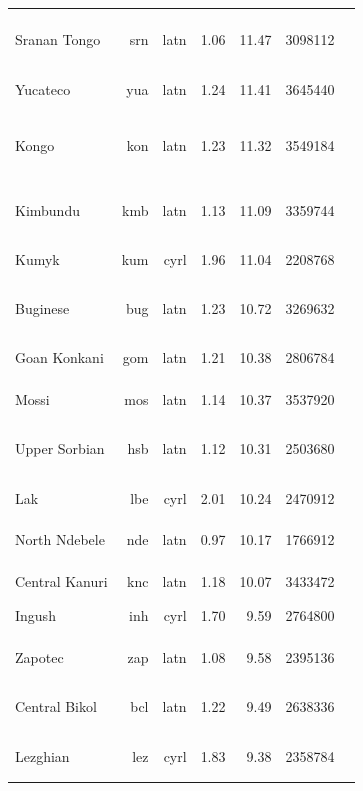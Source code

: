 \documentclass[11pt]{article}
\begin{document}
\begin{center}
\begin{longtable}[width=0.9\textwidth]{|lrrrrrl|}
Sranan Tongo & srn & latn & 1.06 & 11.47 & 3098112 & {\color{madlad400}\rule{3.45cm}{8pt}}{\color{glot500}\rule{0.27cm}{8pt}}{\color{other}\rule{0.2799999999999998cm}{8pt}} \\ 
Yucateco & yua & latn & 1.24 & 11.41 & 3645440 & {\color{madlad400}\rule{4.0cm}{8pt}} \\ 
Kongo & kon & latn & 1.23 & 11.32 & 3549184 & {\color{nllb}\rule{3.23cm}{8pt}}{\color{madlad400}\rule{0.66cm}{8pt}}{\color{glot500}\rule{0.06cm}{8pt}}{\color{other}\rule{0.04999999999999982cm}{8pt}} \\ 
Kimbundu & kmb & latn & 1.13 & 11.09 & 3359744 & {\color{nllb}\rule{2.75cm}{8pt}}{\color{madlad400}\rule{1.25cm}{8pt}}{\color{glot500}\rule{0.0cm}{8pt}} \\ 
Kumyk & kum & cyrl & 1.96 & 11.04 & 2208768 & {\color{madlad400}\rule{3.37cm}{8pt}}{\color{other}\rule{0.6299999999999999cm}{8pt}} \\ 
Buginese & bug & latn & 1.23 & 10.72 & 3269632 & {\color{nllb}\rule{3.75cm}{8pt}}{\color{other}\rule{0.25cm}{8pt}} \\ 
Goan Konkani & gom & latn & 1.21 & 10.38 & 2806784 & {\color{madlad400}\rule{2.22cm}{8pt}}{\color{glot500}\rule{1.7799999999999998cm}{8pt}} \\ 
Mossi & mos & latn & 1.14 & 10.37 & 3537920 & {\color{nllb}\rule{4.0cm}{8pt}}{\color{glot500}\rule{0.0cm}{8pt}} \\ 
Upper Sorbian & hsb & latn & 1.12 & 10.31 & 2503680 & {\color{oscar}\rule{0.23cm}{8pt}}{\color{glot500}\rule{2.12cm}{8pt}}{\color{other}\rule{1.65cm}{8pt}} \\ 
Lak & lbe & cyrl & 2.01 & 10.24 & 2470912 & {\color{other}\rule{4.0cm}{8pt}} \\ 
North Ndebele & nde & latn & 0.97 & 10.17 & 1766912 & {\color{glot500}\rule{2.63cm}{8pt}}{\color{other}\rule{1.37cm}{8pt}} \\ 
Central Kanuri & knc & latn & 1.18 & 10.07 & 3433472 & {\color{nllb}\rule{4.0cm}{8pt}} \\ 
Ingush & inh & cyrl & 1.70 & 9.59 & 2764800 & {\color{other}\rule{4.0cm}{8pt}} \\ 
Zapotec & zap & latn & 1.08 & 9.58 & 2395136 & {\color{madlad400}\rule{3.67cm}{8pt}}{\color{other}\rule{0.33000000000000007cm}{8pt}} \\ 
Central Bikol & bcl & latn & 1.22 & 9.49 & 2638336 & {\color{glot500}\rule{2.19cm}{8pt}}{\color{other}\rule{1.81cm}{8pt}} \\ 
Lezghian & lez & cyrl & 1.83 & 9.38 & 2358784 & {\color{oscar}\rule{0.29cm}{8pt}}{\color{other}\rule{3.71cm}{8pt}} \\ 

\end{longtable}
\end{center}
\end{document}
